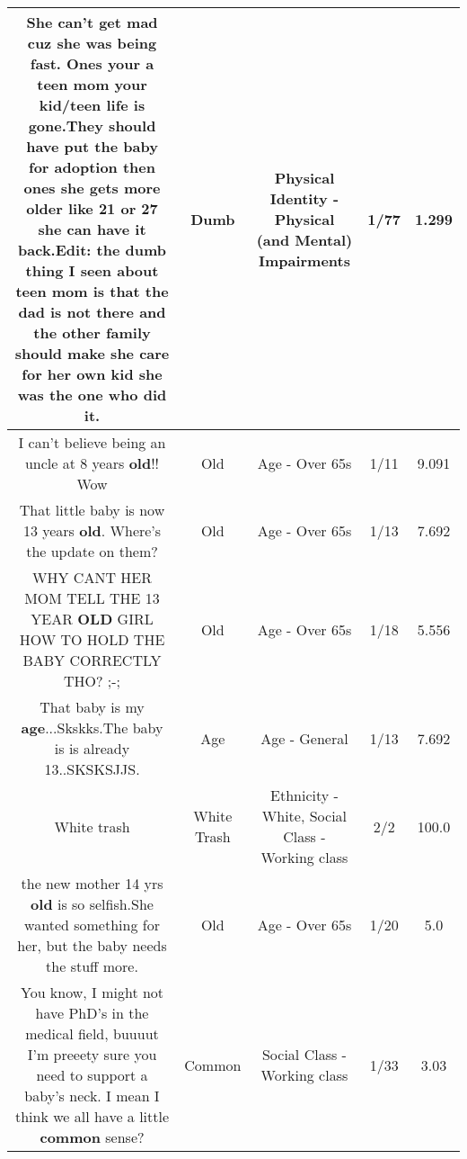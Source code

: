 \documentclass[11pt]{article}
\newlength\mylength
\begin{document}
\begin{center}
\begin{longtable}{|C{.65\mylength}|C{.30\mylength}|C{.12\mylength}|C{.12\mylength}|C{.12\mylength}|}
  \small She can't get mad cuz she was being fast. Ones your a teen mom your kid/teen life is gone.They should have put the baby for adoption then ones she gets more older like 21 or 27 she can have it back.Edit: the \textbf{dumb} thing I seen about teen mom is that the dad is not there and the other family should make she care for her own kid she was the one who did it.\normalsize   & Dumb & Physical Identity - Physical (and Mental) Impairments & 1/77 & 1.299 \\  \hline
  \small I can't believe being an uncle at 8 years \textbf{old}!! Wow\normalsize   & Old & Age - Over 65s & 1/11 & 9.091 \\  \hline
  \small That little baby is now 13 years \textbf{old}. Where's the update on them?\normalsize   & Old & Age - Over 65s & 1/13 & 7.692 \\  \hline
  \small WHY CANT HER MOM TELL THE 13 YEAR \textbf{OLD} GIRL HOW TO HOLD THE BABY CORRECTLY THO? ;-;\normalsize   & Old & Age - Over 65s & 1/18 & 5.556 \\  \hline
  \small That baby is my \textbf{age}...Skskks.The baby is is already 13..SKSKSJJS.\normalsize   & Age & Age - General & 1/13 & 7.692 \\  \hline
  \small White trash\normalsize   & White Trash & Ethnicity - White, Social Class - Working class & 2/2 & 100.0 \\  \hline
  \small the new mother 14 yrs \textbf{old} is so selfish.She wanted something for her, but the baby needs the stuff more.\normalsize   & Old & Age - Over 65s & 1/20 & 5.0 \\  \hline
  \small You know, I might not have PhD's in the medical field, buuuut I'm preeety sure you need to support a baby's neck. I mean I think we all have a little \textbf{common} sense?\normalsize   & Common & Social Class - Working class & 1/33 & 3.03 \\  \hline

\end{longtable}
\end{center}
\end{document}
